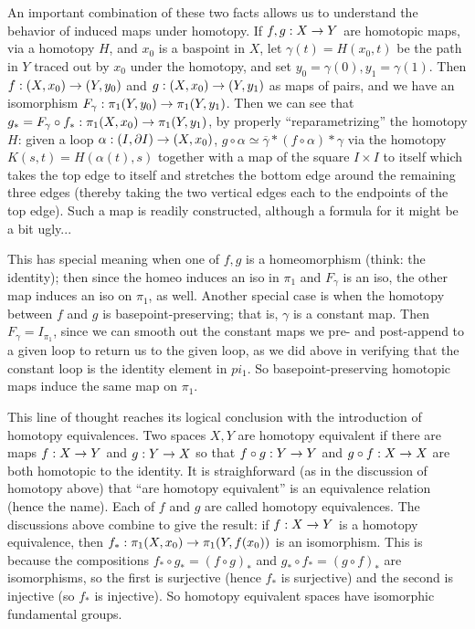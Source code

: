 \msk

An important combination of these two facts allows us to understand the
behavior of induced maps under homotopy. If $f,g:X\rightarrow Y$ are homotopic
maps, via a homotopy $H$, and $x_0$ is a baspoint in $X$, let
$\gamma(t)=H(x_0,t)$ be the path in $Y$ traced out by $x_0$
under the homotopy, and set $y_0=\gamma(0),y_1=\gamma(1)$.
Then $f:(X,x_0)\rightarrow (Y,y_0)$ and $g:(X,x_0)\rightarrow (Y,y_1)$ as maps of pairs,
and we have an isomorphism $F_\gamma:\pi_1(Y,y_0)\rightarrow \pi_1(Y,y_1)$.
Then we can see that $g_*=F_\gamma\circ f_*:\pi_1(X,x_0)\rightarrow \pi_1(Y,y_1)$,
by properly ``reparametrizing'' the homotopy $H$:
given a loop $\alpha:(I,\partial I)\rightarrow (X,x_0)$, 
$g\circ\alpha\simeq \overline{\gamma}*(f\circ\alpha)*\gamma$ via the
homotopy $K(s,t)=H(\alpha(t),s)$ together with a map of the square $I\times I$
to itself which takes the top edge to itself and stretches the bottom edge
around the remaining three edges (thereby taking the two vertical edges
each to the endpoints of the top edge). Such a map is readily constructed,
although a formula for it might be a bit ugly...

\ssk

This has special meaning when one of $f,g$ is a homeomorphism (think: the identity); 
then since
the homeo induces an iso in $\pi_1$ and $F_\gamma$ is an iso, the other
map induces an iso on $\pi_1$, as well. Another special case is when the homotopy
between $f$ and $g$ is basepoint-preserving; that is, $\gamma$ is a constant map. 
Then $F_\gamma=I_{\pi_1}$, since we can smooth out the constant maps we 
pre- and post-append to a given loop to return us to the given loop, as we did
above in verifying that the constant loop is the identity element in $pi_1$.
So basepoint-preserving homotopic maps induce the same map on $\pi_1$. 

\ssk

This line of thought reaches its logical conclusion with the introduction of
homotopy equivalences. Two spaces $X,Y$ are homotopy equivalent if there are maps
$f:X\rightarrow Y$ and $g:Y\rightarrow X$ so that $f\circ g:Y\rightarrow Y$ and $g\circ f:X\rightarrow X$ are
both homotopic to the identity. It is straighforward (as in the discussion of homotopy above)
that ``are homotopy equivalent'' is an equivalence relation (hence the name).
Each of $f$ and $g$ are called homotopy equivalences. The discussions above
combine to give the result: if $f:X\rightarrow Y$ is a homotopy equivalence, then
$f_*:\pi_1(X,x_0)\rightarrow \pi_1(Y,f(x_0))$ is an isomorphism. This is because the
compositions $f_*\circ g_*=(f\circ g)_*$ and $g_*\circ f_*=(g\circ f)_*$ are 
isomorphisms, so the first is surjective (hence $f_*$ is surjective) and 
the second is injective (so $f_*$ is injective). So homotopy equivalent
spaces have isomorphic fundamental groups.

